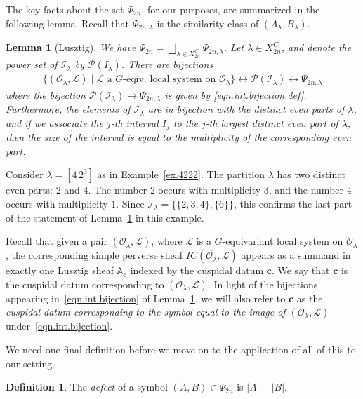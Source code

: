\documentclass[reqno,11pt]{amsart}
\newtheorem{Lem}[Thm]{Lemma}
\theoremstyle{remark}
\theoremstyle{remark}
\theoremstyle{definition}
\theoremstyle{definition}
\theoremstyle{definition}
\newtheorem{Def}[Thm]{Definition}
\numberwithin{equation}{section}
\newcommand{\A}{\mathbb{ A}}
\newcommand{\ci}{\mathcal{I}}
\newcommand{\cl}{\mathcal{L}}
\newcommand{\co}{\mathcal{O}}
\begin{document}
The key facts about the set $\Psi_{2n}$, for our purposes, are summarized in the following lemma.  
Recall that $\Psi_{2n,\lambda}$ is the similarity class of $(A_\lambda, B_\lambda)$.  

\begin{Lem}[Lusztig]\label{lem.int.bijection} 
We have $\Psi_{2n} =  \bigsqcup_{\lambda\in X_{2n}^C} \Psi_{2n, \lambda}$.
Let $\lambda\in X_{2n}^C$, and denote the power set of $\ci_\lambda$ by $\mathscr{P}(I_\lambda)$. There are bijections
\begin{eqnarray}\label{eqn.int.bijection}
\{ (\co_\lambda, \cl) \mid \text{$\cl$ a $G$-eqiv.~local system on $\co_\lambda$} \} \leftrightarrow \mathscr{P}(\ci_\lambda)  \leftrightarrow \Psi_{2n,\lambda} 
\end{eqnarray}
where the bijection $\mathscr{P}(\ci_\lambda)  \rightarrow \Psi_{2n,\lambda}$ is given by \eqref{eqn.int.bijection.def}. Furthermore, the elements of $\ci_\lambda$ are in bijection with the distinct even parts of $\lambda$, and if we associate the $j$-th interval $I_j$ to the $j$-th largest distinct even part of $\lambda$, then the size of the interval is equal to the multiplicity of the corresponding even part. 
\end{Lem}

Consider $\lambda = [4\,2^3]$ as in Example~\ref{ex.4222}. The partition $\lambda$ has two distinct even parts: $2$ and $4$. The number $2$ occurs with multiplicity $3$, and 
the number $4$ occurs with multiplicity $1$. Since $\ci_\lambda = \{  \{2,3,4\},\{6\}\}$, this confirms the last part of the statement of Lemma~\ref{lem.int.bijection} in this example.


Recall that given a pair $(\co_\lambda, \cl)$, where $\cl$ is a $G$-equivariant local system on $\co_\lambda$, the corresponding simple perverse sheaf $IC(\overline{\co_\lambda}, \cl)$ appears as a summand in exactly one Lusztig sheaf $\A_\mathbf{c}$ indexed by the cuspidal datum $\mathbf{c}$.  We say that $\mathbf{c}$ is the cuspidal datum corresponding to $(\co_\lambda, \cl)$.  In light of the bijections appearing in~\eqref{eqn.int.bijection} of Lemma~\ref{lem.int.bijection}, we will also refer to $\mathbf{c}$ as the \emph{cuspidal datum corresponding to the symbol equal to the image of $(\co_\lambda, \cl)$} under~\eqref{eqn.int.bijection}.


We need one final definition before we move on to the application of all of this to our setting.

\begin{Def} The \emph{defect} of a symbol $(A,B) \in \Psi_{2n}$ is $|A|-|B|$.
\end{Def}
\end{document}
